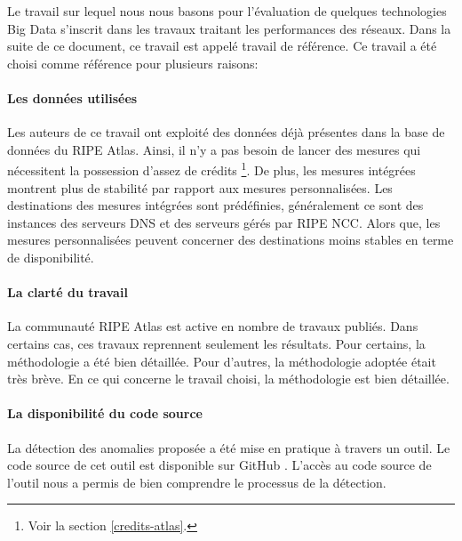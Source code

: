 Le travail sur lequel nous nous basons \cite{DBLP:journals/corr/FontugneAPB16} pour l'évaluation de quelques technologies Big Data s'inscrit dans les travaux traitant les performances des réseaux. Dans la suite de ce document, ce travail est appelé  travail de référence.  Ce travail a été choisi comme référence pour plusieurs raisons:


	
\paragraph{Les données utilisées}  Les auteurs de ce travail ont exploité des données déjà présentes dans la base de données du RIPE Atlas. Ainsi, il n'y a pas besoin de lancer des mesures qui nécessitent la possession d'assez de crédits \footnote{Voir la section \ref{credits-atlas}.}. De plus, les mesures intégrées montrent plus de stabilité par rapport aux mesures personnalisées. Les destinations des mesures intégrées sont prédéfinies, généralement ce sont des instances des serveurs DNS et des serveurs gérés par  RIPE NCC. Alors que, les mesures personnalisées peuvent concerner des destinations moins stables en terme de disponibilité.
	
\paragraph{La clarté du travail} La communauté RIPE Atlas est active en nombre de travaux publiés. Dans certains cas, ces travaux reprennent seulement les résultats. Pour certains,  la méthodologie a été bien détaillée. Pour d'autres, la méthodologie adoptée était très brève. En ce qui concerne le  travail choisi, la méthodologie est bien détaillée.
	
\paragraph{La disponibilité du code source} La détection des anomalies proposée a été mise en pratique à travers un outil. Le code source de cet outil est disponible sur GitHub \cite{InternetHealthReport}. L'accès au code source de l'outil nous a permis de bien comprendre le processus de la détection.

	
